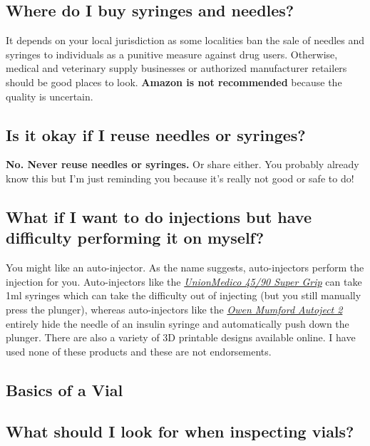 \documentclass{article}
\begin{document}
\subsection{Where do I buy syringes and needles?}

It depends on your local jurisdiction as some localities ban the sale of needles and syringes to individuals as a punitive measure against drug users. Otherwise, medical and veterinary supply businesses or authorized manufacturer retailers should be good places to look. \textbf{Amazon is not recommended} because the quality is uncertain.

\subsection{Is it okay if I reuse needles or syringes?}

\textbf{No. Never reuse needles or syringes. }Or share either. You probably already know this but I’m just reminding you because it’s really not good or safe to do!

\subsection{What if I want to do injections but have difficulty performing it on myself?}\label{5-21}

You might like an auto-injector. As the name suggests, auto-injectors perform the injection for you. Auto-injectors like the \href{https://unionmedico.com/90-super-grip/}{\textit{UnionMedico 45/90 Super Grip}} can take 1ml syringes which can take the difficulty out of injecting (but you still manually press the plunger), whereas auto-injectors like the \href{https://www.owenmumford.com/us/medical-devices/autoject-2}{\textit{Owen Mumford Autoject 2}} entirely hide the needle of an insulin syringe and automatically push down the plunger. There are also a variety of 3D printable designs available online. I have used none of these products and these are not endorsements.

\subsection*{Basics of a Vial}

\subsection{What should I look for when inspecting vials?}
\end{document}
